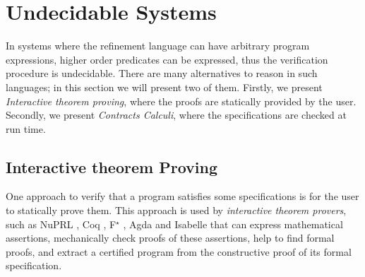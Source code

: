 \newcommand\labelcolor{OliveGreen}


\newcommand\trefc[4]{
\ensuremath{
  \langle
	\texttt{\{#1:} #2  \texttt{|} #3 \texttt{\}}
  \rangle
	^{\color{\labelcolor}#4}
}}

\newcommand\mklabel[1]{\color{\labelcolor}{#1}}


\newcommand\trefint[2]{\trefc{v}{{\color{colorint}\texttt{Int}}}{#1}{#2}}
\newcommand\trefpos[1]{\trefint{v>0}{#1}}

\newcommand\tyint{{\color{colorint}\texttt{Int}}}
\newcommand\ttpos{
\texttt{\{v:{\color{colorint}Int}|v > 0\}}
}

\newcommand\ttpred[1]{
\texttt{\{v:{\color{colorint}Int}|v = #1 - 1\}}
}

\newcommand\tteq[1]{
\texttt{\{v:{\color{colorint}Int}|v = #1\}}
}

\newcommand\tlabel{\rulename{T-Label}}
\newcommand\tcast{\rulename{T-Cast}}

\newcommand\cbase{\rulename{C-Base}}
\newcommand\cfunction{\rulename{C-Fun}}


\newcommand\predname{{\color{blue}\texttt{pred}}}
\newcommand\prednamep{{\color{blue}\texttt{pred'}}}

\newcommand\elabel[1]{\ensuremath{\Uparrow {\mklabel{#1}}}}
\newcommand\ecast[3]{\ensuremath{\langle #1 \Rightarrow #2 \rangle^{{\mklabel{#3}}}}}

\newcommand\isCompatible[2]{\ensuremath{ #1 \Vert #2 }}

\section{Undecidable Systems}\label{sec:undec}

In systems where the refinement language can have arbitrary program expressions,
higher order predicates can be expressed, thus the verification procedure is undecidable.
%
There are many alternatives to reason in such languages;
in this section we will present two of them.
Firstly, we present \textit{Interactive theorem proving},
where the proofs are statically provided by the user.
Secondly, we present \textit{Contracts Calculi},
where the specifications are checked at run time.

\subsection{Interactive theorem Proving}
One approach to verify that a program satisfies some 
specifications is for the user to statically prove them.
% 
This approach is used by \textit{interactive theorem provers}, 
such as 
NuPRL \cite{Constable86},
Coq \cite{coq-book}, F$^\star$ \cite{SwamyCFSBY11}, Agda \cite{norell07}
and Isabelle \cite{NPW2002}
that can express mathematical assertions, 
mechanically check proofs of these assertions, 
help to find formal proofs, 
and extract a certified program from 
the constructive proof of its formal specification.

